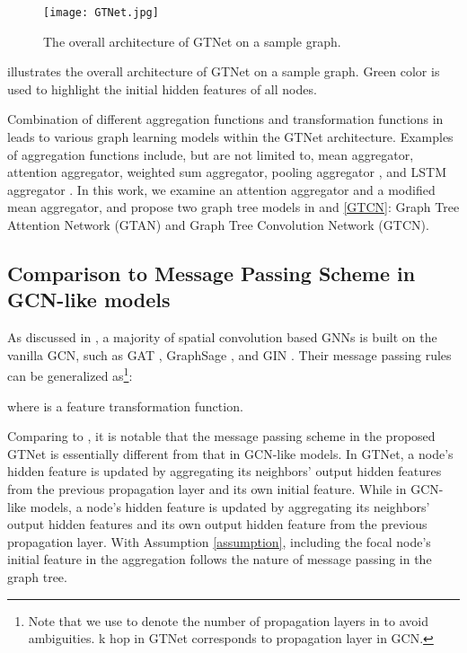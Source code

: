 \documentclass[lettersize,journal]{IEEEtran}
\theoremstyle{plain}
\theoremstyle{definition}
\theoremstyle{remark}
\begin{document}
\begin{figure}[h]
	\begin{center}
		\texttt{[image: GTNet.jpg]}
		\caption{The overall architecture of GTNet on a sample graph.}
		\label{fig:GTNet}
	\end{center}
\end{figure}

 illustrates the overall architecture of GTNet on a sample graph. Green color is used to highlight the initial hidden features of all nodes.

Combination of different aggregation functions and transformation functions in  leads to various graph learning models within the GTNet architecture. Examples of aggregation functions include, but are not limited to, mean aggregator, attention aggregator, weighted sum aggregator, pooling aggregator \cite{hamilton2017inductive}, and LSTM aggregator \cite{hamilton2017inductive}. In this work, we examine an attention aggregator and a modified mean aggregator, and propose two graph tree models in  and \ref{GTCN}: Graph Tree Attention Network (GTAN) and Graph Tree Convolution Network (GTCN).

\subsection{Comparison to Message Passing Scheme in GCN-like models}
\label{compare_rule}
As discussed in , a majority of spatial convolution based GNNs is built on the vanilla GCN, such as GAT \cite{DBLP:conf/iclr/VelickovicCCRLB18}, GraphSage \cite{hamilton2017inductive}, and GIN \cite{xu2018powerful}. Their message passing rules can be generalized as\footnote{Note that we use  to denote the number of propagation layers in  to avoid ambiguities. k hop in GTNet corresponds to  propagation layer in GCN.}:

where  is a feature transformation function.

Comparing to , it is notable that the message passing scheme in the proposed GTNet is essentially different from that in GCN-like models. In GTNet, a node's hidden feature is updated by aggregating its neighbors' output hidden features from the previous propagation layer and its own initial feature. While in GCN-like models, a node's hidden feature is updated by aggregating its neighbors' output hidden features and its own output hidden feature from the previous propagation layer. With Assumption \ref{assumption}, including the focal node's initial feature in the aggregation follows the nature of message passing in the graph tree.
\end{document}
